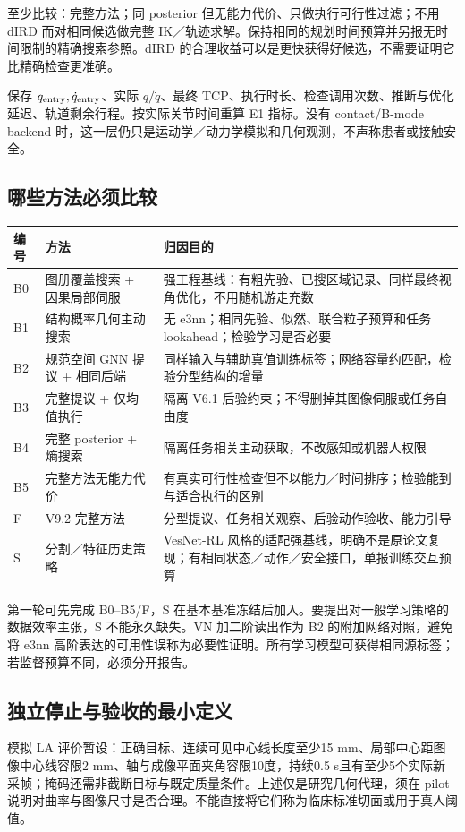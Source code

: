 \documentclass[UTF8,fontset=fandol,11pt,a4paper]{ctexart}
\theoremstyle{plain}
\theoremstyle{definition}
\theoremstyle{remark}
\numberwithin{equation}{section}
\begin{document}
至少比较：完整方法；同 posterior 但无能力代价、只做执行可行性过滤；不用 dIRD 而对相同候选做完整 IK／轨迹求解。保持相同的规划时间预算并另报无时间限制的精确搜索参照。dIRD 的合理收益可以是更快获得好候选，不需要证明它比精确检查更准确。

保存 $q_{\rm entry},\dot q_{\rm entry}$、实际 $q/\dot q$、最终 TCP、执行时长、检查调用次数、推断与优化延迟、轨道剩余行程。按实际关节时间重算 E1 指标。没有 contact/B-mode backend 时，这一层仍只是运动学／动力学模拟和几何观测，不声称患者或接触安全。

\subsection{哪些方法必须比较}
\begin{longtable}{P{16mm}P{49mm}P{81mm}}
\toprule 编号 & 方法 & 归因目的\\\midrule\endhead
B0 & 图册覆盖搜索 + 因果局部伺服 & 强工程基线：有粗先验、已搜区域记录、同样最终视角优化，不用随机游走充数\\
B1 & 结构概率几何主动搜索 & 无 e3nn；相同先验、似然、联合粒子预算和任务 lookahead；检验学习是否必要\\
B2 & 规范空间 GNN 提议 + 相同后端 & 同样输入与辅助真值训练标签；网络容量约匹配，检验分型结构的增量\\
B3 & 完整提议 + 仅均值执行 & 隔离 V6.1 后验约束；不得删掉其图像伺服或任务自由度\\
B4 & 完整 posterior + 熵搜索 & 隔离任务相关主动获取，不改感知或机器人权限\\
B5 & 完整方法无能力代价 & 有真实可行性检查但不以能力／时间排序；检验能到与适合执行的区别\\
F & V9.2 完整方法 & 分型提议、任务相关观察、后验动作验收、能力引导\\
S & 分割／特征历史策略 & VesNet-RL 风格的适配强基线，明确不是原论文复现；有相同状态／动作／安全接口，单报训练交互预算\\\bottomrule
\end{longtable}
第一轮可先完成 B0--B5/F，S 在基本基准冻结后加入。要提出对一般学习策略的数据效率主张，S 不能永久缺失。VN 加二阶读出作为 B2 的附加网络对照，避免将 e3nn 高阶表达的可用性误称为必要性证明。所有学习模型可获得相同源标签；若监督预算不同，必须分开报告。

\subsection{独立停止与验收的最小定义}
模拟 LA 评价暂设：正确目标、连续可见中心线长度至少15 mm、局部中心距图像中心线容限2 mm、轴与成像平面夹角容限10度，持续0.5 s且有至少5个实际新采帧；掩码还需非截断目标与既定质量条件。上述仅是研究几何代理，须在 pilot 说明对曲率与图像尺寸是否合理。不能直接将它们称为临床标准切面或用于真人阈值。
\end{document}
